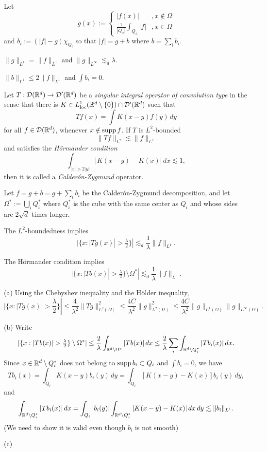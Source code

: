 \documentclass{../note}
\begin{document}
\begin{prb}
Let
\[g(x):=\begin{cases}|f(x)|&,x\notin\Omega\\\frac1{|Q_x|}\int_{Q_x}|f|&,x\in\Omega\end{cases}\]
and $b_i:=(|f|-g)\chi_{Q_i}$ so that $|f|=g+b$ where $b=\sum_ib_i$.
\begin{parts}
\item $\|g\|_{L^1}=\|f\|_{L^1}$ and $\|g\|_{L^\infty}\lesssim_d\lambda$.
\item $\|b\|_{L^1}\le2\|f\|_{L^1}$ and $\int b_i=0$.
\end{parts}
\end{prb}
\begin{pf}

\end{pf}


\begin{prb}
Let $T:\mathcal{D}(\mathbb{R}^d)\to\mathcal{D}'(\mathbb{R}^d)$ be a \emph{singular integral operator of convolution type} in the sense that there is $K\in L_{\mathrm{loc}}^1(\mathbb{R}^d\setminus\{0\})\cap\mathcal{D}'(\mathbb{R}^d)$ such that
\[Tf(x)=\int K(x-y)f(y)\,dy\]
for all $f\in\mathcal{D}(\mathbb{R}^d)$, whenever $x\notin\operatorname{supp} f$.
If $T$ is $L^2$-bounded
\[\|Tf\|_{L^2}\lesssim\|f\|_{L^2}\]
and satisfies the \emph{H\"ormander condition}
\[\int_{|x|>2|y|}|K(x-y)-K(x)|\,dx\lesssim1,\]
then it is called a \emph{Calder\'on-Zygmund} operator.

Let $f=g+b=g+\sum_ib_i$ be the Calder\'on-Zygmund decomposition, and let $\Omega^*:=\bigcup_iQ_i^*$ where $Q_i^*$ is the cube with the same center as $Q_i$ and whose sides are $2\sqrt d$ times longer. 
\begin{parts}
\item
The $L^2$-boundedness implies
\[|\{x:|Tg(x)|>\tfrac\lambda2\}|\lesssim_d\frac1\lambda\|f\|_{L^1}.\]
\item
The H\"ormander condition implies
\[|\{x:|Tb(x)|>\tfrac\lambda2\}\setminus\Omega^*|\lesssim_d\frac1\lambda\|f\|_{L^1}.\]
\item
\end{parts}
\end{prb}
\begin{pf}
(a)
Using the Chebyshev inequality and the H\"older inequality,
\[|\{x:|Tg(x)|>\frac\lambda2\}|
\le\frac4{\lambda^2}\|Tg\|_{L^2(\Omega)}^2
\le\frac{4C}{\lambda^2}\|g\|_{L^2(\Omega)}^2
\le\frac{4C}{\lambda^2}\|g\|_{L^1(\Omega)}\|g\|_{L^\infty(\Omega)}.
\]

(b)
Write
\[|\{x:|Tb(x)|>\tfrac\lambda2\}\setminus\Omega^*|
\le\frac2\lambda\int_{\R^d\setminus\Omega^*}|Tb(x)|\,dx
\le\frac2\lambda\sum_i\int_{\R^d\setminus Q_i^*}|Tb_i(x)|\,dx.\]
Since $x\in\mathbb{R}^d\setminus Q_i^*$ does not belong to $\operatorname{supp} b_i\subset Q_i$ and $\int b_i=0$, we have
\[Tb_i(x)=\int_{Q_i}K(x-y)b_i(y)\,dy=\int_{Q_i}[K(x-y)-K(x)]b_i(y)\,dy,\]
and
\[\int_{\mathbb{R}^d\setminus Q_i^*}|Tb_i(x)|\,dx
=\int_{Q_i}|b_i(y)|\int_{\mathbb{R}^d\setminus Q_i^*}|K(x-y)-K(x)|\,dx\,dy
\lesssim\|b_i\|_{L^1}.\]
(We need to show it is valid even though $b_i$ is not smooth)

(c)

\end{pf}
\end{document}
